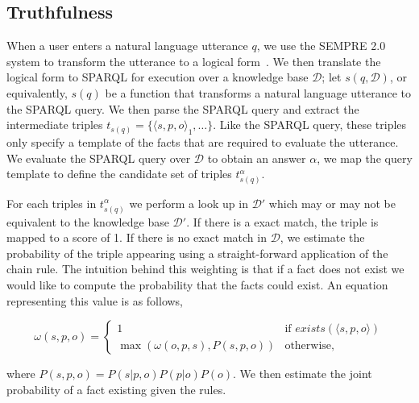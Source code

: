 

\subsection{Truthfulness}
\label{sec:probqa-interface}

When a user enters a natural language utterance \(q\), we use the SEMPRE 2.0 system to transform the utterance to a logical form~\cite{berant2013freebase,berant2013semantic}.
We then translate the logical form to SPARQL for execution over a knowledge base \(\mathcal{D}\);
let \(s(q,\mathcal{D})\), or equivalently, \(s(q)\) be a function that transforms a natural language utterance to the SPARQL query.
We then parse the SPARQL query and extract the intermediate triples \( t_{s(q)} = \{\langle s,p,o\rangle_1, \ldots \}\). 
Like the SPARQL query, these triples only specify a template of the facts that are required to evaluate the utterance.
We evaluate the SPARQL query over \(\mathcal{D}\) to obtain an answer \( \alpha \), we map the query template to define the candidate set of triples \( t^\alpha_{s(q)} \).

For each triples in \( t^\alpha_{s(q)} \) we perform a look up in \(\mathcal{D'}\) which may or may not be equivalent to the knowledge base \(\mathcal{D'}\).
If there is a exact match, the triple is mapped to a score of 1.
If there is no exact match in \(\mathcal{D}\), we estimate the probability of the triple appearing using a straight-forward application of the chain rule.
The intuition behind this weighting is that if a fact does not exist we would like to compute the probability that the facts could exist.
An equation representing this value is as follows,

\begin{equation}
  \label{eq:probqa-weight}
  \omega(s,p,o) = \begin{cases}
    1 & \mbox{if } exists(\langle s,p,o \rangle) \\ 
    \max( \omega(o,p,s), P(s,p,o)) & \mbox{otherwise,}
  \end{cases}
\end{equation}

where \( P(s,p,o) = P(s|p,o)  P(p|o)  P(o) \).
We then estimate the joint probability of a fact existing given the rules.



